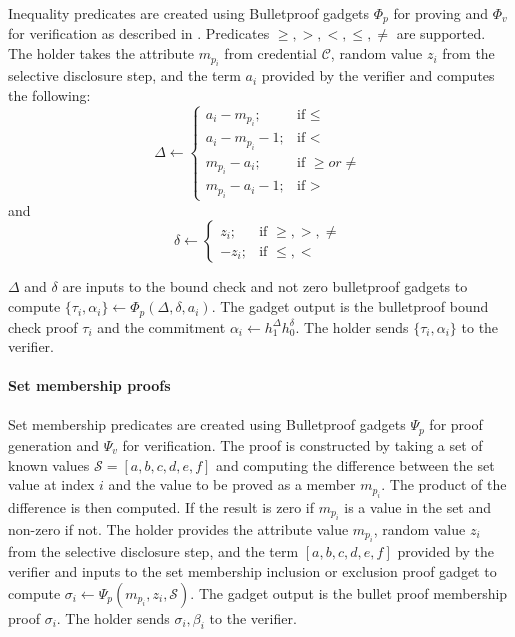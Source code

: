 \documentclass[a4paper]{article}
\begin{document}
Inequality predicates are created using Bulletproof gadgets $\Phi_p$ for proving and $\Phi_v$ for verification as described in \cite{BBBPWM18}. Predicates $\geq,  >, <, \leq, \neq$ are supported. The holder takes the attribute $m_{p_i}$ from credential $\mathcal{C}$, random value $z_i$ from the selective disclosure step, and the term $a_i$ provided by the verifier and computes the following:
$$
\Delta \leftarrow \begin{cases}
a_i-m_{p_i}; & \mbox{if } \leq\\
a_i-m_{p_i}-1; & \mbox{if }  <\\
m_{p_i}-a_i; & \mbox{if } \geq or \neq\\
m_{p_i}-a_i-1; & \mbox{if } >
\end{cases}
$$
and
$$
\delta \leftarrow \begin{cases}
z_i; &\mbox{if } \geq, >, \neq\\
-z_i; &\mbox{if } \leq, <
\end{cases}
$$

$\Delta$ and $\delta$ are inputs to the bound check and not zero bulletproof gadgets to compute $\{\tau_i, \alpha_i\} \leftarrow \Phi_p(\Delta, \delta, a_i)$. The gadget output is the bulletproof bound check proof $\tau_i$ and the commitment $\alpha_i\leftarrow h_1^{\Delta}h_0^{\delta}$.
The holder sends $\{\tau_i, \alpha_i\}$ to the verifier.\\\\
\textbf{Set membership proofs}\\\\
Set membership predicates are created using Bulletproof gadgets $\Psi_p$ for proof generation and $\Psi_v$ for verification. The proof is constructed by taking a set of known values $\mathcal{S} = [a, b, c, d, e, f]$ and computing the difference between the set value at index $i$ and the value to be proved as a member $m_{p_i}$. The product of the difference is then computed. If the result is zero if $m_{p_i}$ is a value in the set and non-zero if not.
The holder provides the attribute value $m_{p_i}$, random value $z_i$ from the selective disclosure step, and the term $[a, b, c, d, e, f]$ provided by the verifier and inputs to the set membership inclusion or exclusion proof gadget to compute $\sigma_i\leftarrow \Psi_p(m_{p_i}, z_i, \mathcal{S})$. The gadget output is the bullet proof membership proof $\sigma_i$. The holder sends $\sigma_i, \beta_i$ to the verifier.
\end{document}
